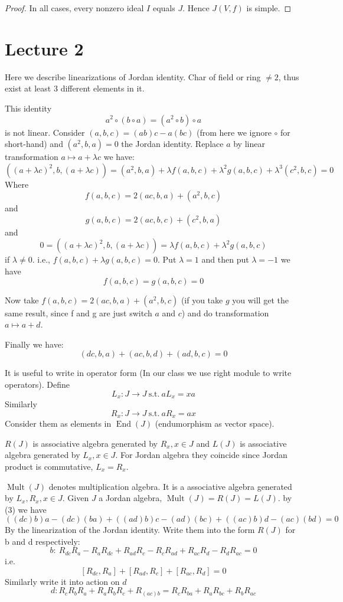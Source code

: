 \documentclass{article}
\begin{document}
\begin{proof}
In all cases, every nonzero ideal $I$ equals $J$. Hence $J(V,f)$ is simple.
\end{proof}

\section{Lecture 2}

Here we describe linearizations of Jordan identity. Char of field or ring $\ne 2$, thus exist at least 3 different elements in it. 

This identity
\begin{equation}
a^2 \circ (b \circ a)=(a^2 \circ b) \circ a \tag{1}
\end{equation}
is not linear. Consider $ (a,b,c)=(ab)c - a(bc)$ (from here we ignore $ \circ $ for short-hand) and $ (a^2,b,a)=0 $ the Jordan identity. Replace $ a $ by linear transformation $ a \mapsto a+\lambda c $ we have:
\[
((a+\lambda c)^2 ,b , (a+\lambda c))=(a^2,b,a) +\lambda f(a,b,c)+ \lambda^2 g(a,b,c)+\lambda^3(c^2,b,c)=0
\]    
Where 
\begin{equation}
 f(a,b,c)=2(ac,b,a)+(a^2,b,c) \tag{2}
\end{equation}
and 
\begin{equation*}
g(a,b,c)=2(ac,b,c)+(c^2,b,a)
\end{equation*}
and 
\[
0= ((a+\lambda c)^2 ,b , (a+\lambda c)) =\lambda f(a,b,c)+ \lambda^2 g(a,b,c)
\]
if $ \lambda \neq 0 $. i.e., $f(a,b,c)+ \lambda g(a,b,c)=0 $. Put $ \lambda =1 $ and then put $ \lambda = -1 $ we have 
\[ 
f(a,b,c)= g(a,b,c)=0
\]

Now take $ f(a,b,c)=2(ac,b,a)+(a^2,b,c) $ (if you take $ g $ you will get the same result, since f and g are just switch $ a $ and $ c $) and do transformation $ a \mapsto a+d $.   

Finally we have:
\[
(dc,b,a)+(ac,b,d)+(ad,b,c)=0 \tag{3}
\] 

It is useful to write in operator form (In our class we use right module to write operators). Define
\[
L_x: J\rightarrow J \ \text{s.t.} \ aL_x=xa
\]
Similarly
\[
R_x: J\rightarrow J \ \text{s.t.} \ aR_x=ax
\]
Consider them as elements in $ \operatorname{End}(J) $ (endumorphism as vector space). 

$ R(J) $ is associative algebra generated by $ R_x, x \in J $ and $ L(J) $ is associative algebra generated by $ L_x, x \in J $. For Jordan algebra they coincide since Jordan product is commutative, $ L_x =R_x $. 

$ \operatorname{Mult}(J) $ denotes multiplication algebra. It is a associative algebra generated by $ L_x, R_x, x \in J $. Given $ J $ a Jordan algebra, $ \operatorname{Mult}(J)=R(J)=L(J) $. by (3) we have
\[
((dc)b)a-(dc)(ba)+((ad)b)c-(ad)(bc)+((ac)b)d-(ac)(bd)=0
\]
By the linearization of the Jordan identity. Write them into the form $ R(J) $ for b and d respectively:
\[
b: \ R_{dc}R_a-R_aR_{dc}+R_{ad}R_c-R_cR_{ad}+R_{ac}R_d-R_dR_{ac}=0
\]
i.e.
\[
[R_{dc},R_a]+ [R_{ad},R_c]+[R_{ac},R_d]=0
\]
Similarly write it into action on $ d $
\begin{equation}
d:  R_cR_bR_a+R_aR_bR_c+R_{(ac)b}=R_cR_{ba}+R_aR_{bc}+R_bR_{ac} \tag{**}
\end{equation}
\end{document}
